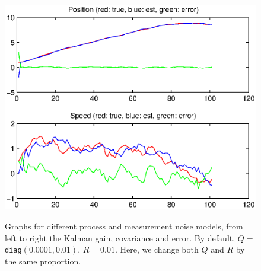\documentclass[a4paper,12pt]{article}
\begin{document}
\begin{enumerate}
\begin{figure}
{{        \includegraphics[width=.43\textwidth]{figures/kf/rqlow_error}
      }
    }
    \caption{Graphs for different process and measurement noise models, from
        left to right the Kalman gain, covariance and error. By default,
        $Q=$\texttt{diag}$(0.0001,0.01)$, $R=0.01$. Here, we change both $Q$ and
      $R$ by the same proportion.}
    \label{fig:prop}
  \end{figure}
  

\end{enumerate}
\end{document}
